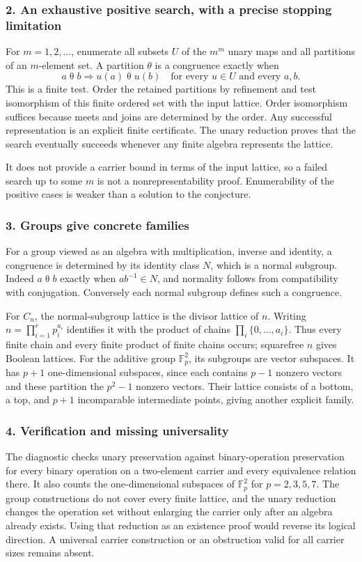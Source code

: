 \documentclass[11pt,a4paper]{article}
\begin{document}
\subsubsection{2. An exhaustive positive search, with a precise stopping limitation}
For $m=1,2,\ldots$, enumerate all subsets $U$ of the $m^m$ unary maps and all partitions of an $m$-element set. A partition $\theta$ is a congruence exactly when
\[a\mathrel\theta b\Longrightarrow u(a)\mathrel\theta u(b)
\quad\text{for every }u\in U\text{ and every }a,b.
\]
This is a finite test. Order the retained partitions by refinement and test isomorphism of this finite ordered set with the input lattice. Order isomorphism suffices because meets and joins are determined by the order. Any successful representation is an explicit finite certificate. The unary reduction proves that the search eventually succeeds whenever any finite algebra represents the lattice.

It does not provide a carrier bound in terms of the input lattice, so a failed search up to some $m$ is not a nonrepresentability proof. Enumerability of the positive cases is weaker than a solution to the conjecture.

\subsubsection{3. Groups give concrete families}
For a group viewed as an algebra with multiplication, inverse and identity, a congruence is determined by its identity class $N$, which is a normal subgroup. Indeed $a\mathrel\theta b$ exactly when $ab^{-1}\in N$, and normality follows from compatibility with conjugation. Conversely each normal subgroup defines such a congruence.

For $C_n$, the normal-subgroup lattice is the divisor lattice of $n$. Writing $n=\prod_{i=1}^r p_i^{a_i}$ identifies it with the product of chains $\prod_i\{0,\ldots,a_i\}$. Thus every finite chain and every finite product of finite chains occurs; squarefree $n$ gives Boolean lattices. For the additive group $\mathbb F_p^2$, its subgroups are vector subspaces. It has $p+1$ one-dimensional subspaces, since each contains $p-1$ nonzero vectors and these partition the $p^2-1$ nonzero vectors. Their lattice consists of a bottom, a top, and $p+1$ incomparable intermediate points, giving another explicit family.

\subsubsection{4. Verification and missing universality}
The diagnostic checks unary preservation against binary-operation preservation for every binary operation on a two-element carrier and every equivalence relation there. It also counts the one-dimensional subspaces of $\mathbb F_p^2$ for $p=2,3,5,7$. The group constructions do not cover every finite lattice, and the unary reduction changes the operation set without enlarging the carrier only after an algebra already exists. Using that reduction as an existence proof would reverse its logical direction. A universal carrier construction or an obstruction valid for all carrier sizes remains absent.
\end{document}
